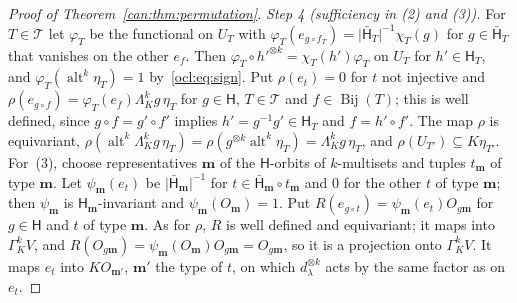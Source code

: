 \documentclass[11pt]{amsart}
\theoremstyle{definition}
\theoremstyle{remark}
\numberwithin{equation}{section}
\newcommand{\abs}[1]{\lvert #1\rvert}
\theoremstyle{plain}
\theoremstyle{definition}
\theoremstyle{plain}
\newcommand{\alt}{\operatorname{alt}}
\begin{document}
\begin{proof}[Proof of Theorem~\ref{can:thm:permutation}]
\emph{Step 4 (sufficiency in (2) and (3)).} For $T\in\mathcal T$ let $\varphi_T$ be the functional on $U_T$ with
$\varphi_T(e_{g\circ f_T})=\abs{\bar{\mathsf H}_T}^{-1}\chi_T(g)$ for $g\in\bar{\mathsf H}_T$ that vanishes on the other
$e_f$. Then $\varphi_T\circ h'^{\otimes k}=\chi_T(h')\varphi_T$ on $U_T$ for $h'\in\mathsf H_T$, and
$\varphi_T(\alt^k\eta_T)=1$ by~\eqref{ocl:eq:sign}. Put $\rho(e_t)=0$ for $t$ not injective and $\rho(e_{g\circ
f})=\varphi_T(e_f)\Lambda^k_Kg\,\eta_T$ for $g\in\mathsf H$, $T\in\mathcal T$ and $f\in\operatorname{Bij}(T)$; this is
well defined, since $g\circ f=g'\circ f'$ implies $h'=g^{-1}g'\in\mathsf H_T$ and $f=h'\circ f'$. The map $\rho$ is
equivariant, $\rho(\alt^k\Lambda^k_Kg\,\eta_T)=\rho(g^{\otimes k}\alt^k\eta_T)=\Lambda^k_Kg\,\eta_T$, and
$\rho(U_{T'})\subseteq K\eta_{T'}$. For~(3), choose representatives $\mathbf m$ of the $\mathsf H$-orbits of
$k$-multisets and tuples $t_{\mathbf m}$ of type $\mathbf m$. Let $\psi_{\mathbf m}(e_t)$ be $\abs{\bar{\mathsf
H}_{\mathbf m}}^{-1}$ for $t\in\bar{\mathsf H}_{\mathbf m}\circ t_{\mathbf m}$ and $0$ for the other $t$ of type
$\mathbf m$; then $\psi_{\mathbf m}$ is $\mathsf H_{\mathbf m}$-invariant and $\psi_{\mathbf m}(O_{\mathbf m})=1$. Put
$R(e_{g\circ t})=\psi_{\mathbf m}(e_t)O_{g\mathbf m}$ for $g\in\mathsf H$ and $t$ of type $\mathbf m$. As for $\rho$,
$R$ is well defined and equivariant; it maps into $\Gamma^k_KV$, and $R(O_{g\mathbf m})=\psi_{\mathbf m}(O_{\mathbf
m})O_{g\mathbf m}=O_{g\mathbf m}$, so it is a projection onto $\Gamma^k_KV$. It maps $e_t$ into $KO_{\mathbf m'}$,
$\mathbf m'$ the type of $t$, on which $d_\lambda^{\otimes k}$ acts by the same factor as on $e_t$.
\end{proof}
\end{document}
